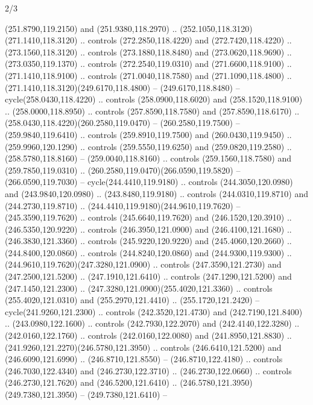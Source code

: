 \begin{flagdescription}{2/3}
\begin{scope}[xshift=0.5\flaglength,yshift=0.5\flagwidth,scale=\flagwidth/259.2]
\begin{scope}[y=0.8pt, x=0.8pt, yscale=-1,shift={(-243,-162)}]
      (251.8790,119.2150) and (251.9380,118.2970) ..
      (252.1050,118.3120)(271.1410,118.3120) .. controls (272.2850,118.4220) and
      (272.7420,118.4220) .. (273.1560,118.3120) .. controls (273.1880,118.8480) and
      (273.0620,118.9690) .. (273.0350,119.1370) .. controls (272.2540,119.0310) and
      (271.6600,118.9100) .. (271.1410,118.9100) .. controls (271.0040,118.7580) and
      (271.1090,118.4800) .. (271.1410,118.3120)(249.6170,118.4800) --
      (249.6170,118.8480) -- cycle(258.0430,118.4220) .. controls
      (258.0900,118.6020) and (258.1520,118.9100) .. (258.0000,118.8950) .. controls
      (257.8590,118.7580) and (257.8590,118.6170) ..
      (258.0430,118.4220)(260.2580,119.0470) -- (260.2580,119.7500) --
      (259.9840,119.6410) .. controls (259.8910,119.7500) and (260.0430,119.9450) ..
      (259.9960,120.1290) .. controls (259.5550,119.6250) and (259.0820,119.2580) ..
      (258.5780,118.8160) -- (259.0040,118.8160) .. controls (259.1560,118.7580) and
      (259.7850,119.0310) .. (260.2580,119.0470)(266.0590,119.5820) --
      (266.0590,119.7030) -- cycle(244.4410,119.9180) .. controls
      (244.3050,120.0980) and (243.9840,120.0980) .. (243.8480,119.9180) .. controls
      (244.0310,119.8710) and (244.2730,119.8710) ..
      (244.4410,119.9180)(244.9610,119.7620) -- (245.3590,119.7620) .. controls
      (245.6640,119.7620) and (246.1520,120.3910) .. (246.5350,120.9220) .. controls
      (246.3950,121.0900) and (246.4100,121.1680) .. (246.3830,121.3360) .. controls
      (245.9220,120.9220) and (245.4060,120.2660) .. (244.8400,120.0860) .. controls
      (244.8240,120.0860) and (244.9300,119.9300) ..
      (244.9610,119.7620)(247.3280,121.0900) .. controls (247.3590,121.2730) and
      (247.2500,121.5200) .. (247.1910,121.6410) .. controls (247.1290,121.5200) and
      (247.1450,121.2300) .. (247.3280,121.0900)(255.4020,121.3360) .. controls
      (255.4020,121.0310) and (255.2970,121.4410) .. (255.1720,121.2420) --
      cycle(241.9260,121.2300) .. controls (242.3520,121.4730) and
      (242.7190,121.8400) .. (243.0980,122.1600) .. controls (242.7930,122.2070) and
      (242.4140,122.3280) .. (242.0160,122.1760) .. controls (242.0160,122.0080) and
      (241.8950,121.8830) .. (241.9260,121.2270)(246.5780,121.3950) .. controls
      (246.6410,121.5200) and (246.6090,121.6990) .. (246.8710,121.8550) --
      (246.8710,122.4180) .. controls (246.7030,122.4340) and (246.2730,122.3710) ..
      (246.2730,122.0660) .. controls (246.2730,121.7620) and (246.5200,121.6410) ..
      (246.5780,121.3950)(249.7380,121.3950) -- (249.7380,121.6410) --

\end{scope}
\end{scope}
\end{flagdescription}
